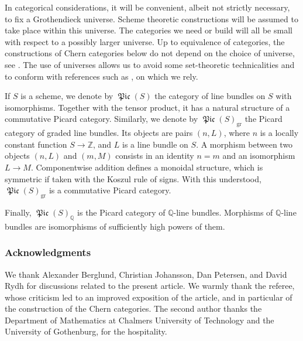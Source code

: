 \documentclass[JEP,XML,SOM,Unicode,published]{cedram}
\theoremstyle{plain}
\theoremstyle{definition}
\newcommand{\QBbb}{\mathbb Q}
\newcommand{\ZBbb}{\mathbb Z}
\DeclareMathOperator{\Picfr}{\mathfrak{Pic}}
\begin{document}
In categorical considerations, it will be convenient, albeit not strictly necessary, to fix a Grothendieck universe. Scheme theoretic constructions will be assumed to take place within this universe. The categories we need or build will all be small with respect to a possibly larger universe. Up to equivalence of categories, the constructions of Chern categories below do not depend on the choice of universe, see \cite[App.\,F]{ThomasonTrobaugh}. The use of universes allows us to avoid some set-theoretic technicalities and to conform with references such as \cite{ThomasonTrobaugh}, on which we rely.

If $S$ is a scheme, we denote by $\Picfr(S)$ the category of line bundles on $S$ with isomorphisms. Together with the tensor product, it has a natural structure of a commutative Picard category. Similarly, we denote by $\Picfr(S)_{\mathrm{gr}}$ the Picard category of graded line bundles. Its objects are pairs $(n,L)$, where $n$ is a locally constant function $S\to\ZBbb$, and $L$ is a line bundle on $S$. A morphism between two objects $(n,L)$ and $(m,M)$ consists in an identity $n=m$ and an isomorphism $L\to M$. Componentwise addition defines a monoidal structure, which is symmetric if taken with the Koszul rule of signs. With this understood, $\Picfr(S)_{\mathrm{gr}}$ is a commutative Picard category.

Finally, $\Picfr(S)_{\QBbb}$ is the Picard category of $\QBbb$-line bundles. Morphisms of $\QBbb$-line bundles are isomorphisms of sufficiently high powers of them.

\subsubsection*{Acknowledgments}
We thank Alexander Berglund, Christian Johansson, Dan Petersen, and David Rydh for discussions related to the present article. We warmly thank the referee, whose criticism led to an improved exposition of the article, and in particular of the construction of the Chern categories. The second author thanks the Department of Mathematics at Chalmers University of Technology and the University of Gothenburg, for the hospitality.
\end{document}
